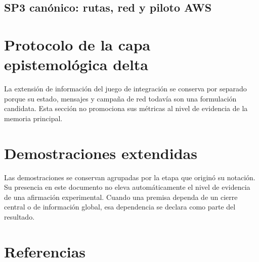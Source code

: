 \documentclass[12pt,a4paper]{article}
\begin{document}
\subsection{SP3 canónico: rutas, red y piloto AWS}






\clearpage
\section{Protocolo de la capa epistemológica delta}

La extensión de información del juego de integración se conserva por separado
porque su estado, mensajes y campaña de red todavía son una formulación
candidata. Esta sección no promociona sus métricas al nivel de evidencia de la
memoria principal.


\clearpage
\section{Demostraciones extendidas}
\label{app:sp1-all-proofs}
\newcommand{\VIUFullSPsixProofs}{}

Las demostraciones se conservan agrupadas por la etapa que originó su notación. Su presencia en este documento no eleva automáticamente el nivel de evidencia de una afirmación experimental. Cuando una premisa dependa de un cierre central o de información global, esa dependencia se declara como parte del resultado.










\clearpage
\section{Referencias}
\printbibliography[heading=none]
\end{document}
